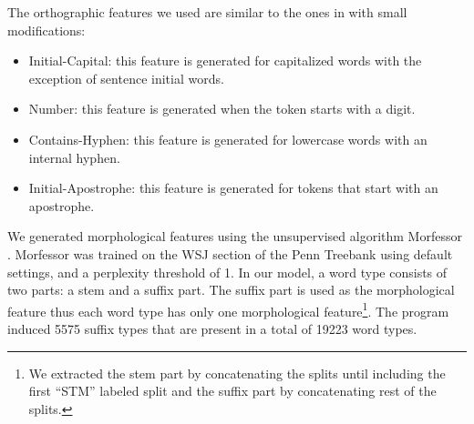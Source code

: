
The orthographic features we used are similar to the ones in
\cite{bergkirkpatrick-EtAl:2010:NAACLHLT} with small modifications:

\begin{itemize}
\item Initial-Capital: this feature is generated for capitalized words
  with the exception of sentence initial words.
\item Number: this feature is generated when the token starts with a
  digit.
\item Contains-Hyphen: this feature is generated for lowercase words
  with an internal hyphen.
\item Initial-Apostrophe: this feature is generated for tokens that
  start with an apostrophe.
\end{itemize}

We generated morphological features using the unsupervised algorithm
Morfessor \cite{creutz05}.  Morfessor was trained on the WSJ section
of the Penn Treebank using default settings, and a perplexity
threshold of 1.  In our model, a word type consists of two parts: a
stem and a suffix part.  The suffix part is used as the morphological
feature thus each word type has only one morphological
feature\footnote{We extracted the stem part by concatenating the
  splits until including the first ``STM'' labeled split and the
  suffix part by concatenating rest of the splits.}.  The program
induced 5575 suffix types that are present in a total of 19223 word
types.


